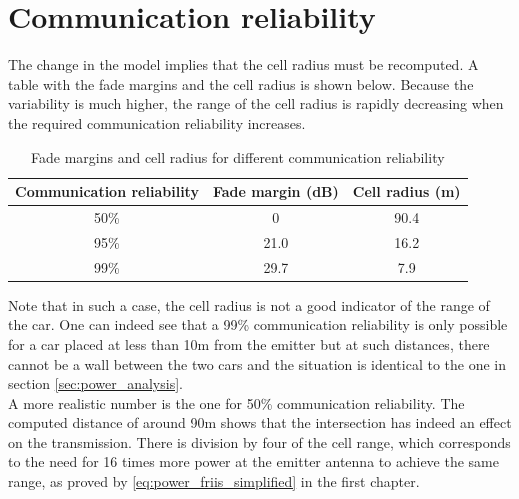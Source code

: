 \documentclass[10pt,a4paper]{ULBreport}
\begin{document}
\section{Communication reliability}

The change in the model implies that the cell radius must be recomputed. A table with the fade margins and the cell radius is shown below. Because the variability is much higher, the range of the cell radius is rapidly decreasing when the required communication reliability increases. \\

\begin{table}[H]
    \centering
    \begin{tabular}{|c c c|}
        \hline
        Communication reliability & Fade margin (dB) & Cell radius (m) \\ \hline
        50\% & 0 & 90.4 \\ \hline
        95\% & 21.0 & 16.2 \\ \hline
        99\% & 29.7 & 7.9 \\ \hline
    \end{tabular}
    \caption{Fade margins and cell radius for different communication reliability}
    \label{tab:fade_margins_2}
\end{table}

Note that in such a case, the cell radius is not a good indicator of the range of the car. One can indeed see that a 99\% communication reliability is only possible for a car placed at less than 10m from the emitter but at such distances, there cannot be a wall between the two cars and the situation is identical to the one in section \ref{sec:power_analysis}. \\
A more realistic number is the one for 50\% communication reliability. The computed distance of around 90m shows that the intersection has indeed an effect on the transmission. There is division by four of the cell range, which corresponds to the need for 16 times more power at the emitter antenna to achieve the same range, as proved by \ref{eq:power_friis_simplified} in the first chapter. \\



\end{document}
